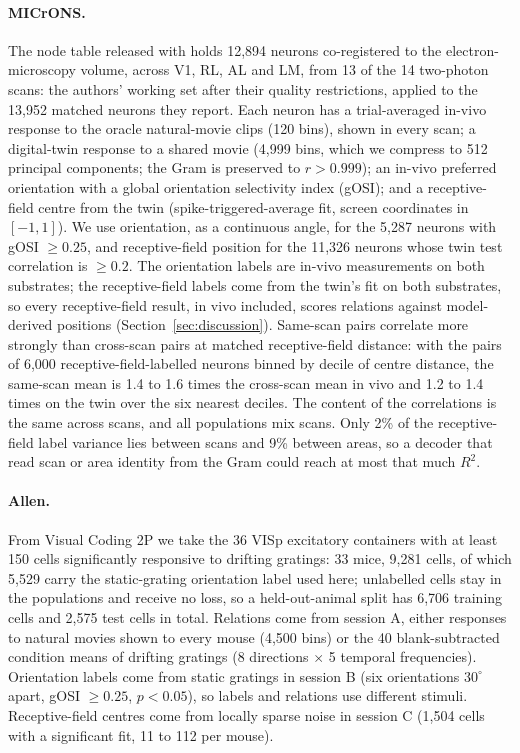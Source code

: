 \documentclass[11pt]{article}
\newcommand{\Rsq}{R^{2}}
\begin{document}
\paragraph{MICrONS.} The node table released with \citet{ding2025} holds 12,894 neurons co-registered to the electron-microscopy volume, across V1, RL, AL and LM, from 13 of the 14 two-photon scans: the authors' working set after their quality restrictions, applied to the 13,952 matched neurons they report. Each neuron has a trial-averaged in-vivo response to the oracle natural-movie clips (120 bins), shown in every scan; a digital-twin response to a shared movie (4,999 bins, which we compress to 512 principal components; the Gram is preserved to $r > 0.999$); an in-vivo preferred orientation with a global orientation selectivity index (gOSI); and a receptive-field centre from the twin (spike-triggered-average fit, screen coordinates in $[-1,1]$). We use orientation, as a continuous angle, for the 5,287 neurons with gOSI $\geq 0.25$, and receptive-field position for the 11,326 neurons whose twin test correlation is $\geq 0.2$. The orientation labels are in-vivo measurements on both substrates; the receptive-field labels come from the twin's fit on both substrates, so every receptive-field result, in vivo included, scores relations against model-derived positions (Section~\ref{sec:discussion}). Same-scan pairs correlate more strongly than cross-scan pairs at matched receptive-field distance: with the pairs of 6,000 receptive-field-labelled neurons binned by decile of centre distance, the same-scan mean is 1.4 to 1.6 times the cross-scan mean in vivo and 1.2 to 1.4 times on the twin over the six nearest deciles. The content of the correlations is the same across scans, and all populations mix scans. Only 2\% of the receptive-field label variance lies between scans and 9\% between areas, so a decoder that read scan or area identity from the Gram could reach at most that much $\Rsq$.

\paragraph{Allen.} From Visual Coding 2P \citep{devries2020} we take the 36 VISp excitatory containers with at least 150 cells significantly responsive to drifting gratings: 33 mice, 9,281 cells, of which 5,529 carry the static-grating orientation label used here; unlabelled cells stay in the populations and receive no loss, so a held-out-animal split has 6,706 training cells and 2,575 test cells in total. Relations come from session A, either responses to natural movies shown to every mouse (4,500 bins) or the 40 blank-subtracted condition means of drifting gratings (8 directions $\times$ 5 temporal frequencies). Orientation labels come from static gratings in session B (six orientations $30^\circ$ apart, gOSI $\geq 0.25$, $p < 0.05$), so labels and relations use different stimuli. Receptive-field centres come from locally sparse noise in session C (1,504 cells with a significant fit, 11 to 112 per mouse).
\end{document}
